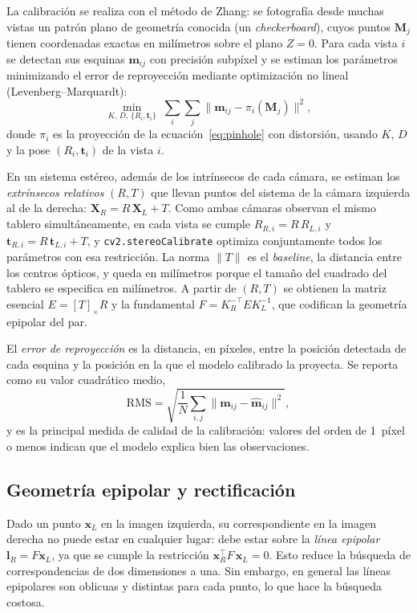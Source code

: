 \documentclass[conference]{IEEEtran}
\begin{document}
La calibración se realiza con el método de Zhang: se fotografía desde muchas
vistas un patrón plano de geometría conocida (un \emph{checkerboard}), cuyos
puntos $\mathbf{M}_j$ tienen coordenadas exactas en milímetros sobre el plano
$Z=0$. Para cada vista $i$ se detectan sus esquinas $\mathbf{m}_{ij}$ con
precisión subpíxel y se estiman los parámetros minimizando el error de
reproyección mediante optimización no lineal (Levenberg--Marquardt):
\begin{equation}
  \min_{K,\,D,\,\{R_i,\mathbf{t}_i\}}\;
  \sum_{i}\sum_{j}\bigl\|\mathbf{m}_{ij}-\pi_i(\mathbf{M}_j)\bigr\|^2,
\end{equation}
donde $\pi_i$ es la proyección de la ecuación~\eqref{eq:pinhole} con
distorsión, usando $K$, $D$ y la pose $(R_i,\mathbf{t}_i)$ de la vista $i$.

En un sistema estéreo, además de los intrínsecos de cada cámara, se estiman
los \emph{extrínsecos relativos} $(R, T)$ que llevan puntos del sistema de la
cámara izquierda al de la derecha:
$\mathbf{X}_R = R\,\mathbf{X}_L + T$. Como ambas cámaras observan el mismo
tablero simultáneamente, en cada vista se cumple $R_{R,i}=R\,R_{L,i}$ y
$\mathbf{t}_{R,i}=R\,\mathbf{t}_{L,i}+T$, y \texttt{cv2.stereoCalibrate}
optimiza conjuntamente todos los parámetros con esa restricción. La norma
$\|T\|$ es el \emph{baseline}, la distancia entre los centros ópticos, y queda
en milímetros porque el tamaño del cuadrado del tablero se especifica en
milímetros. A partir de $(R,T)$ se obtienen la matriz esencial
$E=[T]_\times R$ y la fundamental $F=K_R^{-\top}EK_L^{-1}$, que codifican la
geometría epipolar del par.

El \emph{error de reproyección} es la distancia, en píxeles, entre la posición
detectada de cada esquina y la posición en la que el modelo calibrado la
proyecta. Se reporta como su valor cuadrático medio,
\begin{equation}
  \mathrm{RMS}=\sqrt{\frac{1}{N}\sum_{i,j}\bigl\|\mathbf{m}_{ij}-\hat{\mathbf{m}}_{ij}\bigr\|^2},
\end{equation}
y es la principal medida de calidad de la calibración: valores del orden de
1~píxel o menos indican que el modelo explica bien las observaciones.

\subsection{Geometría epipolar y rectificación}

Dado un punto $\mathbf{x}_L$ en la imagen izquierda, su correspondiente en la
imagen derecha no puede estar en cualquier lugar: debe estar sobre la
\emph{línea epipolar} $\mathbf{l}_R=F\mathbf{x}_L$, ya que se cumple la
restricción $\mathbf{x}_R^\top F\,\mathbf{x}_L=0$. Esto reduce la búsqueda de
correspondencias de dos dimensiones a una. Sin embargo, en general las
líneas epipolares son oblicuas y distintas para cada punto, lo que hace la
búsqueda costosa.
\end{document}
